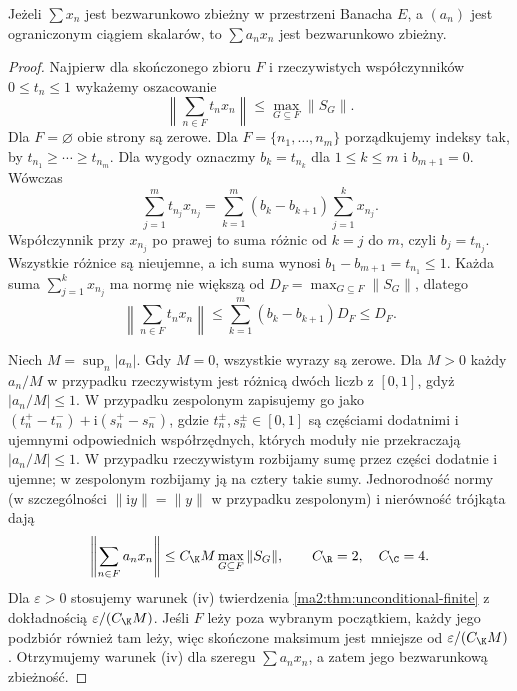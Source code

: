 \begin{twierdzenie}
\label{ma2:thm:unconditional-multipliers}
Jeżeli $\sum x_n$ jest bezwarunkowo zbieżny w przestrzeni
Banacha $E$, a $(a_n)$ jest ograniczonym ciągiem skalarów,
to $\sum a_nx_n$ jest bezwarunkowo zbieżny.
\end{twierdzenie}
\begin{proof}
Najpierw dla skończonego zbioru $F$ i rzeczywistych
współczynników $0\le t_n\le1$ wykażemy oszacowanie
\[
 \left\|\sum_{n\in F}t_n x_n\right\|
 \le \max_{G\subseteq F}\|S_G\|.
\]
Dla $F=\varnothing$ obie strony są zerowe. Dla
$F=\{n_1,\ldots,n_m\}$ porządkujemy indeksy tak, by
$t_{n_1}\ge\cdots\ge t_{n_m}$. Dla wygody oznaczmy
$b_k=t_{n_k}$ dla $1\le k\le m$ i $b_{m+1}=0$.
Wówczas
\[
 \sum_{j=1}^m t_{n_j}x_{n_j}
 =\sum_{k=1}^m(b_k-b_{k+1})
               \sum_{j=1}^k x_{n_j}.
\]
Współczynnik przy $x_{n_j}$ po prawej to suma
różnic od $k=j$ do $m$, czyli $b_j=t_{n_j}$.
Wszystkie różnice są nieujemne, a ich suma wynosi
$b_1-b_{m+1}=t_{n_1}\le1$. Każda suma
$\sum_{j=1}^k x_{n_j}$ ma normę nie większą od
$D_F=\max_{G\subseteq F}\|S_G\|$, dlatego
\[
 \left\|\sum_{n\in F}t_nx_n\right\|
 \le \sum_{k=1}^m(b_k-b_{k+1})D_F
 \le D_F.
\]

Niech $M=\sup_n|a_n|$. Gdy $M=0$, wszystkie
wyrazy są zerowe. Dla $M>0$ każdy $a_n/M$
w przypadku rzeczywistym jest różnicą dwóch liczb
z $[0,1]$, gdyż $|a_n/M|\le1$. W przypadku zespolonym zapisujemy go jako
$(t_n^+-t_n^-)+\mathrm i(s_n^+-s_n^-)$,
gdzie $t_n^\pm,s_n^\pm\in[0,1]$ są częściami dodatnimi
i ujemnymi odpowiednich współrzędnych, których moduły
nie przekraczają $|a_n/M|\le1$.
W przypadku rzeczywistym rozbijamy sumę przez części
dodatnie i ujemne; w zespolonym rozbijamy ją na cztery
takie sumy. Jednorodność normy (w szczególności
$\|\mathrm i y\|=\|y\|$ w przypadku zespolonym) i
nierówność trójkąta dają
\[
 \left\|\sum_{n\in F}a_nx_n\right\|
 \le C_{\K}M\max_{G\subseteq F}\|S_G\|,\qquad
 C_{\R}=2,\quad C_{\C}=4.
\]
Dla $\varepsilon>0$ stosujemy warunek (iv) twierdzenia
\ref{ma2:thm:unconditional-finite} z dokładnością
$\varepsilon/(C_{\K}M)$. Jeśli $F$ leży poza wybranym
początkiem, każdy jego podzbiór również tam leży,
więc skończone maksimum jest mniejsze od
$\varepsilon/(C_{\K}M)$. Otrzymujemy warunek (iv)
dla szeregu $\sum a_nx_n$, a zatem jego bezwarunkową
zbieżność.
\end{proof}

